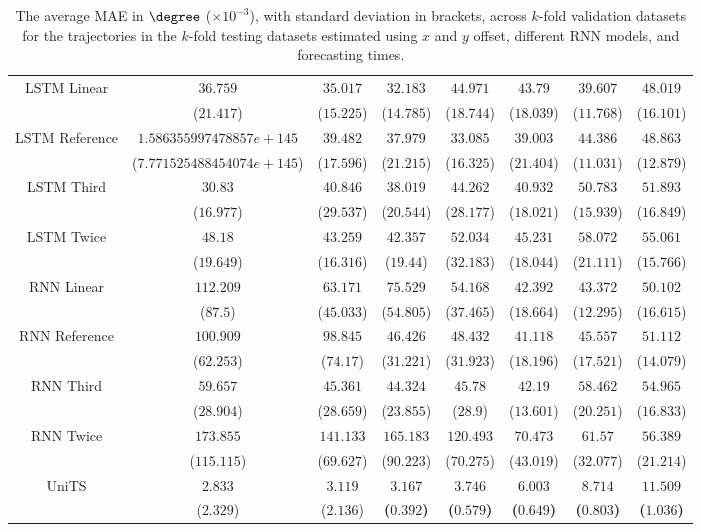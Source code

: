 \begin{table}[!ht]
{\begin{tabular}{|c|c|c|c|c|c|c|c|}
			\multirow{2}{*}{LSTM Linear} & $36.759$ & $35.017$ & $32.183$ & $44.971$ & $43.79$ & $39.607$ & $48.019$ \\
			 & ($21.417$) & ($15.225$) & ($14.785$) & ($18.744$) & ($18.039$) & ($11.768$) & ($16.101$) \\ \hline
			\multirow{2}{*}{LSTM Reference} & $1.586355997478857e+145$ & $39.482$ & $37.979$ & $33.085$ & $39.003$ & $44.386$ & $48.863$ \\
			 & ($7.771525488454074e+145$) & ($17.596$) & ($21.215$) & ($16.325$) & ($21.404$) & ($11.031$) & ($12.879$) \\ \hline
			\multirow{2}{*}{LSTM Third} & $30.83$ & $40.846$ & $38.019$ & $44.262$ & $40.932$ & $50.783$ & $51.893$ \\
			 & ($16.977$) & ($29.537$) & ($20.544$) & ($28.177$) & ($18.021$) & ($15.939$) & ($16.849$) \\ \hline
			\multirow{2}{*}{LSTM Twice} & $48.18$ & $43.259$ & $42.357$ & $52.034$ & $45.231$ & $58.072$ & $55.061$ \\
			 & ($19.649$) & ($16.316$) & ($19.44$) & ($32.183$) & ($18.044$) & ($21.111$) & ($15.766$) \\ \hline
			\multirow{2}{*}{RNN Linear} & $112.209$ & $63.171$ & $75.529$ & $54.168$ & $42.392$ & $43.372$ & $50.102$ \\
			 & ($87.5$) & ($45.033$) & ($54.805$) & ($37.465$) & ($18.664$) & ($12.295$) & ($16.615$) \\ \hline
			\multirow{2}{*}{RNN Reference} & $100.909$ & $98.845$ & $46.426$ & $48.432$ & $41.118$ & $45.557$ & $51.112$ \\
			 & ($62.253$) & ($74.17$) & ($31.221$) & ($31.923$) & ($18.196$) & ($17.521$) & ($14.079$) \\ \hline
			\multirow{2}{*}{RNN Third} & $59.657$ & $45.361$ & $44.324$ & $45.78$ & $42.19$ & $58.462$ & $54.965$ \\
			 & ($28.904$) & ($28.659$) & ($23.855$) & ($28.9$) & ($13.601$) & ($20.251$) & ($16.833$) \\ \hline
			\multirow{2}{*}{RNN Twice} & $173.855$ & $141.133$ & $165.183$ & $120.493$ & $70.473$ & $61.57$ & $56.389$ \\
			 & ($115.115$) & ($69.627$) & ($90.223$) & ($70.275$) & ($43.019$) & ($32.077$) & ($21.214$) \\ \hline
			\multirow{2}{*}{UniTS} & $2.833$ & $3.119$ & $\mathbf{3.167}$ & $\mathbf{3.746}$ & $\mathbf{6.003}$ & $\mathbf{8.714}$ & $\mathbf{11.509}$ \\
			 & ($2.329$) & ($2.136$) & \textbf{(}$\mathbf{0.392}$\textbf{)} & \textbf{(}$\mathbf{0.579}$\textbf{)} & \textbf{(}$\mathbf{0.649}$\textbf{)} & \textbf{(}$\mathbf{0.803}$\textbf{)} & \textbf{(}$\mathbf{1.036}$\textbf{)} \\ \hline
		\end{tabular}
	}
	\caption{The average MAE in $\degree$ ($\times 10^{-3}$), with standard deviation in brackets, across $k$-fold validation datasets for the trajectories in the $k$-fold testing datasets estimated using $x$ and $y$ offset, different RNN models, and forecasting times.}
	\label{tab:all_no_abs_MAE}
\end{table}